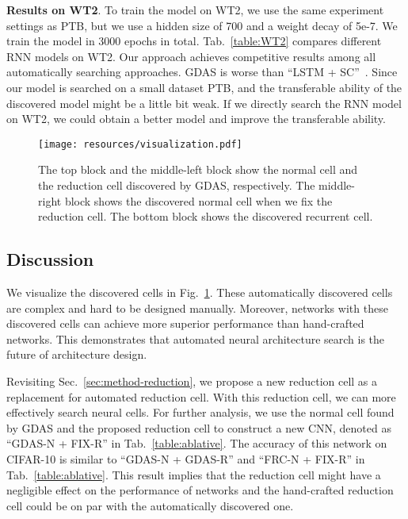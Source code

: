 \documentclass[10pt,twocolumn,letterpaper]{article}
\def\Figref#1{Fig.~\ref{#1}}
\def\Secref#1{Sec.~\ref{#1}}
\def\Tabref#1{Tab.~\ref{#1}}
\begin{document}
\textbf{Results on WT2}.
To train the model on WT2, we use the same experiment settings as PTB, but we use a hidden size of 700 and a weight decay of 5e-7. We train the model in 3000 epochs in total.
\Tabref{table:WT2} compares different RNN models on WT2.
Our approach achieves competitive results among all automatically searching approaches.
GDAS is worse than ``LSTM + SC''~\cite{merity2018regularizing}.
Since our model is searched on a small dataset PTB, and the transferable ability of the discovered model might be a little bit weak. If we directly search the RNN model on WT2, we could obtain a better model and improve the transferable ability.



\begin{figure}[t!]
\begin{center}
\texttt{[image: resources/visualization.pdf]}
\end{center}
\caption[Captioning]{
The top block and the middle-left block show the normal cell and the reduction cell discovered by GDAS, {respectively}. The middle-right block shows the discovered normal cell when we fix the reduction cell. The bottom block shows the discovered recurrent cell.
}
\vspace{-2mm}
\label{fig:cell-vis}
\end{figure}





\subsection{Discussion}\label{sec:exp-dis}


We visualize the discovered cells in \Figref{fig:cell-vis}.
These automatically discovered cells are complex and hard to be designed manually.
Moreover, networks with these discovered cells can achieve more superior performance than hand-crafted networks.
This demonstrates that automated neural architecture search is the future of architecture design.



Revisiting \Secref{sec:method-reduction}, we propose a new reduction cell as a replacement for automated reduction cell.
With this reduction cell, we can more effectively search neural cells.
For further analysis, we use the normal cell found by GDAS and the proposed reduction cell to construct a new CNN, denoted as ``GDAS-N + FIX-R'' in \Tabref{table:ablative}.
The accuracy of this network on CIFAR-10 is similar to ``GDAS-N + GDAS-R'' and ``FRC-N + FIX-R'' in \Tabref{table:ablative}.
This result implies that the reduction cell might have a negligible effect on the performance of networks and the hand-crafted reduction cell could be on par with the automatically discovered one.
\end{document}

